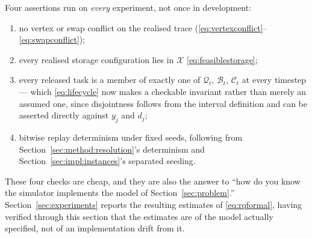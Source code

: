 \documentclass[../main.tex]{subfiles}
\begin{document}
Four assertions run on \emph{every} experiment, not once in development:
\begin{enumerate}
  \item no vertex or swap conflict on the realised trace
    (\eqref{eq:vertexconflict}--\eqref{eq:swapconflict});
  \item every realised storage configuration lies in $\mathcal{X}$
    \eqref{eq:feasiblestorage};
  \item every released task is a member of exactly one of $\mathcal{Q}_t$,
    $\mathcal{B}_t$, $\mathcal{C}_t$ at every timestep --- which
    \eqref{eq:lifecycle} now makes a checkable invariant rather than merely
    an assumed one, since disjointness follows from the interval definition
    and can be asserted directly against $y_j$ and $d_j$;
  \item bitwise replay determinism under fixed seeds, following from
    Section~\ref{sec:method:resolution}'s determinism and
    Section~\ref{sec:impl:instances}'s separated seeding.
\end{enumerate}
These four checks are cheap, and they are also the answer to ``how do you
know the simulator implements the model of Section~\ref{sec:problem}.''
Section~\ref{sec:experiments} reports the resulting estimates of
\eqref{eq:rqformal}, having verified through this section that the estimates
are of the model actually specified, not of an implementation drift from it.
\end{document}
